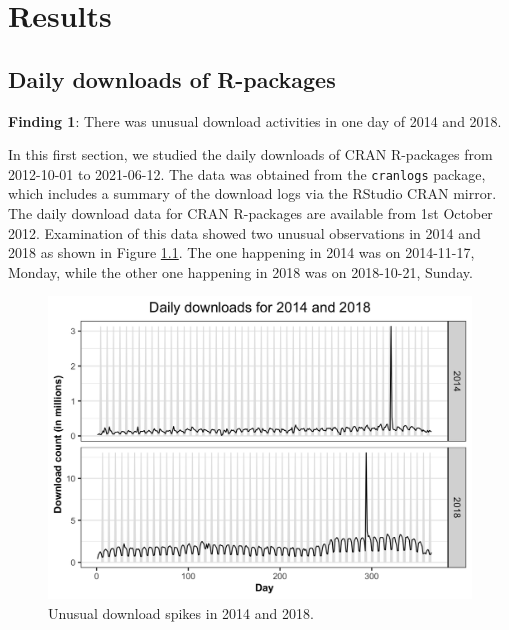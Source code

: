 \documentclass[
]{book}
\newenvironment{discovery}[1]{%
  \begin{tcolorbox}[colback=blue!30,colframe=blue!80!black]#1}{\end{tcolorbox}}
\begin{document}
\hypertarget{results}{%
\chapter{Results}\label{results}}

\hypertarget{daily-downloads-of-r-packages}{%
\section{Daily downloads of R-packages}\label{daily-downloads-of-r-packages}}

\begin{discovery}
\textbf{Finding 1}: There was unusual download activities in one day of
2014 and 2018.
\end{discovery}

In this first section, we studied the daily downloads of CRAN R-packages from 2012-10-01 to 2021-06-12. The data was obtained from the \texttt{cranlogs} package\autocite{cranlogs}, which includes a summary of the download logs via the RStudio CRAN mirror. The daily download data for CRAN R-packages are available from 1st October 2012. Examination of this data showed two unusual observations in 2014 and 2018 as shown in Figure \ref{fig:unusual-spikes}. The one happening in 2014 was on 2014-11-17, Monday, while the other one happening in 2018 was on 2018-10-21, Sunday.



\begin{figure}

{\centering \includegraphics{figures/unusual-spikes-1} 

}

\caption{Unusual download spikes in 2014 and 2018.}\label{fig:unusual-spikes}
\end{figure}
\end{document}
